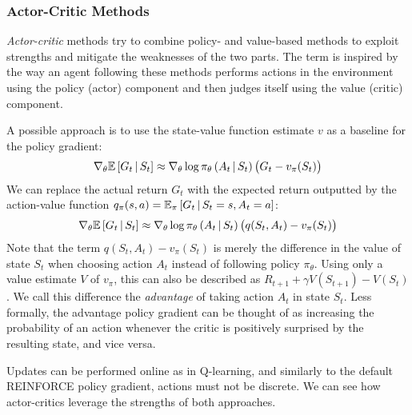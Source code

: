 \subsubsection{Actor-Critic Methods}
\textit{Actor-critic} methods \cite{bible} try to combine policy- and value-based methods to exploit strengths and mitigate the weaknesses of the two parts. The term is inspired by the way an agent following these methods performs actions in the environment using the policy (actor) component and then judges itself using the value (critic) component.

A possible approach is to use the state-value function estimate $v$ as a baseline for the policy gradient:
\begin{equation*}
    \nabla_\theta \mathbb{E}\left[G_t \,\middle|\, S_t \right] \approx \nabla_\theta \log \pi_\theta\left(A_t \,\middle|\, S_t\right) \left(G_t - v_\pi(S_t)\right)
\end{equation*}
We can replace the actual return $G_t$ with the expected return outputted by the action-value function $q_\pi(s, a) = \mathbb{E}_\pi \left[G_t \,\middle|\, S_t = s, A_t = a\right]$:
\begin{equation*}
    \nabla_\theta \mathbb{E}\left[G_t \,\middle|\, S_t \right] \approx \nabla_\theta \log \pi_\theta\left(A_t \,\middle|\, S_t\right) \left(q(S_t, A_t) - v_\pi(S_t)\right)
\end{equation*}
Note that the term $q(S_t, A_t) - v_\pi(S_t)$ is merely the difference in the value of state $S_t$ when choosing action $A_t$ instead of following policy $\pi_\theta$. Using only a value estimate $V$ of $v_\pi$, this can also be described as $R_{t+1} + \gamma V(S_{t+1}) - V(S_t)$ \cite{a3c}. We call this difference the \textit{advantage} of taking action $A_t$ in state $S_t$. Less formally, the advantage policy gradient can be thought of as increasing the probability of an action whenever the critic is positively surprised by the resulting state, and vice versa.

Updates can be performed online as in Q-learning, and similarly to the default REINFORCE policy gradient, actions must not be discrete. We can see how actor-critics leverage the strengths of both approaches.